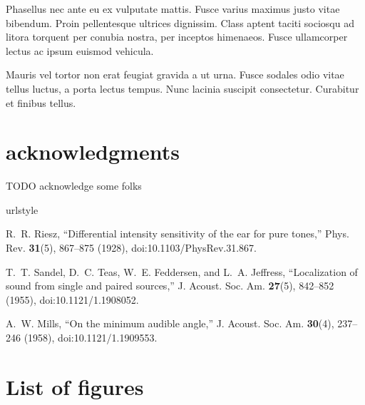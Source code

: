 \documentclass[12pt,oneside]{article}
\renewcommand{\url}{\begingroup \def\UrlLeft{}\def\UrlRight{}\urlstyle{same}\Url}
\begin{document}
Phasellus nec ante eu ex vulputate mattis. Fusce varius maximus justo
vitae bibendum. Proin pellentesque ultrices dignissim. Class aptent
taciti sociosqu ad litora torquent per conubia nostra, per inceptos
himenaeos. Fusce ullamcorper lectus ac ipsum euismod vehicula.

Mauris vel tortor non erat feugiat gravida a ut urna. Fusce sodales odio
vitae tellus luctus, a porta lectus tempus. Nunc lacinia suscipit
consectetur. Curabitur et finibus tellus.

\cleardoublepage

\section*{acknowledgments}TODO acknowledge some folks\cleardoublepage


\begin{thebibliography}{1}
\newcommand{\enquote}[1]{``#1''}
\providecommand{\url}[1]{\texttt{#1}}
\providecommand{\urlprefix}{URL }
\expandafter\ifx\csname urlstyle\endcsname\relax
  \providecommand{\doi}[1]{doi:\discretionary{}{}{}#1}\else
  \providecommand{\doi}{doi:\discretionary{}{}{}\begingroup
  \urlstyle{rm}\Url}\fi

R.~R. Riesz, \enquote{Differential intensity sensitivity of the ear for pure
  tones,} Phys. Rev. \textbf{31}(5), 867--875 (1928),
  \doi{10.1103/PhysRev.31.867}.

T.~T. Sandel, D.~C. Teas, W.~E. Feddersen, and L.~A. Jeffress,
  \enquote{Localization of sound from single and paired sources,} J. Acoust.
  Soc. Am. \textbf{27}(5), 842--852 (1955), \doi{10.1121/1.1908052}.

A.~W. Mills, \enquote{On the minimum audible angle,} J. Acoust. Soc. Am.
  \textbf{30}(4), 237--246 (1958), \doi{10.1121/1.1909553}.

\end{thebibliography}


\cleardoublepage
\processdelayedfloats
\cleardoublepage
\section*{List of figures}
\end{document}
